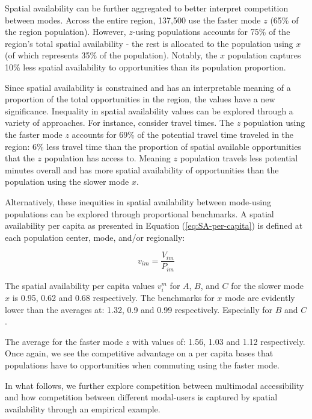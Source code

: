 \documentclass[numbered]{trbunofficial}
\begin{document}
Spatial availability can be further aggregated to better interpret
competition between modes. Across the entire region, 137,500 use the
faster mode \(z\) (65\% of the region population). However, \(z\)-using
populations accounts for 75\% of the region's total spatial availability
- the rest is allocated to the population using \(x\) (of which
represents 35\% of the population). Notably, the \(x\) population
captures 10\% less spatial availability to opportunities than its
population proportion.

Since spatial availability is constrained and has an interpretable
meaning of a proportion of the total opportunities in the region, the
values have a new significance. Inequality in spatial availability
values can be explored through a variety of approaches. For instance,
consider travel times. The \(z\) population using the faster mode \(z\)
accounts for 69\% of the potential travel time traveled in the region:
6\% less travel time than the proportion of spatial available
opportunities that the \(z\) population has access to. Meaning \(z\)
population travels less potential minutes overall and has more spatial
availability of opportunities than the population using the slower mode
\(x\).

Alternatively, these inequities in spatial availability between
mode-using populations can be explored through proportional benchmarks.
A spatial availability per capita as presented in Equation
(\ref{eq:SA-per-capita}) is defined at each population center, mode,
and/or regionally:

\begin{equation}
\label{eq:SA-per-capita}
v_{im} = \frac{V_{im}}{P_{im}}
\end{equation}

The spatial availability per capita values \(v_i^m\) for \(A\), \(B\),
and \(C\) for the slower mode \(x\) is 0.95, 0.62 and 0.68 respectively.
The benchmarks for \(x\) mode are evidently lower than the averages at:
1.32, 0.9 and 0.99 respectively. Especially for \(B\) and \(C\).

The average for the faster mode \(z\) with values of: 1.56, 1.03 and
1.12 respectively. Once again, we see the competitive advantage on a per
capita bases that populations have to opportunities when commuting using
the faster mode.

In what follows, we further explore competition between multimodal
accessibility and how competition between different modal-users is
captured by spatial availability through an empirical example.
\end{document}
